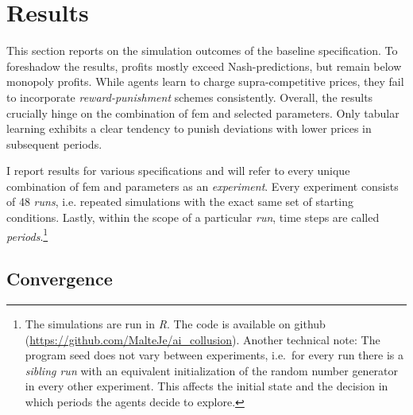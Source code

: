 \section{Results}\label{results}
This section reports on the simulation outcomes of the baseline specification. To foreshadow the results, profits mostly exceed Nash-predictions, but remain below monopoly profits. While agents learn to charge supra-competitive prices, they fail to incorporate \emph{reward-punishment} schemes consistently. Overall, the results crucially hinge on the combination of \gls{fem} and selected parameters. Only tabular learning exhibits a clear tendency to punish deviations with lower prices in subsequent periods.

I report results for various specifications and will refer to every unique combination of \gls{fem} and parameters as an \emph{experiment}. Every experiment consists of 48 \emph{runs}, i.e. repeated simulations with the exact same set of starting conditions. Lastly, within the scope of a particular \emph{run}, time steps are called \emph{periods}.\footnote{The simulations are run in \emph{R}. The code is available on github (\url{https://github.com/MalteJe/ai_collusion}). Another technical note: The program seed does not vary between experiments, i.e.\ for every run there is a \emph{sibling run} with an equivalent initialization of the random number generator in every other experiment. This affects the initial state and the decision in which periods the agents decide to explore.}

\subsection{Convergence}\label{convergence}


